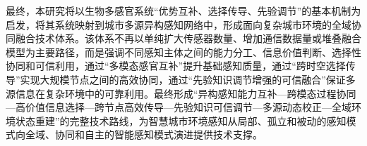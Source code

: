 最终，本研究将以生物多感官系统“优势互补、选择传导、先验调节”的基本机制为启发，将其系统映射到城市多源异构感知网络中，形成面向复杂城市环境的全域协同融合技术体系。该体系不再以单纯扩大传感器数量、增加通信数据量或堆叠融合模型为主要路径，而是强调不同感知主体之间的能力分工、信息价值判断、选择性协同和可信利用，通过“多模态感官互补”提升基础感知质量，通过“跨时空选择传导”实现大规模节点之间的高效协同，通过“先验知识调节增强的可信融合”保证多源信息在复杂环境中的可靠利用。最终形成“异构感知能力互补—跨模态过程协同—高价值信息选择—跨节点高效传导—先验知识可信调节—多源动态校正—全域环境状态重建”的完整技术路线，为智慧城市环境感知从局部、孤立和被动的感知模式向全域、协同和自主的智能感知模式演进提供技术支撑。




